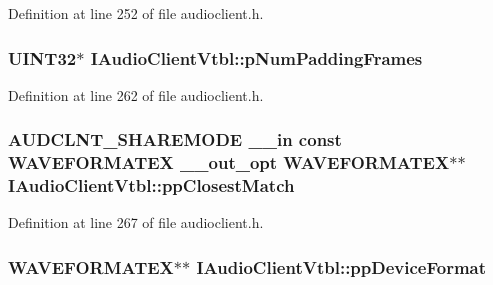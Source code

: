 Definition at line 252 of file audioclient.\+h.

\subsubsection[{\texorpdfstring{p\+Num\+Padding\+Frames}{pNumPaddingFrames}}]{ U\+I\+N\+T32$\ast$ I\+Audio\+Client\+Vtbl\+::p\+Num\+Padding\+Frames}\hypertarget{struct_i_audio_client_vtbl_a917f56ed290e4ee86ad5dd4ec68967b7}{}\label{struct_i_audio_client_vtbl_a917f56ed290e4ee86ad5dd4ec68967b7}


Definition at line 262 of file audioclient.\+h.

\subsubsection[{\texorpdfstring{pp\+Closest\+Match}{ppClosestMatch}}]{ {\bf A\+U\+D\+C\+L\+N\+T\+\_\+\+S\+H\+A\+R\+E\+M\+O\+DE} {\bf \+\_\+\+\_\+in} {\bf const} W\+A\+V\+E\+F\+O\+R\+M\+A\+T\+EX {\bf \+\_\+\+\_\+out\+\_\+opt} W\+A\+V\+E\+F\+O\+R\+M\+A\+T\+EX$\ast$$\ast$ I\+Audio\+Client\+Vtbl\+::pp\+Closest\+Match}\hypertarget{struct_i_audio_client_vtbl_a690b0f60f22b91482b2cec7c25163463}{}\label{struct_i_audio_client_vtbl_a690b0f60f22b91482b2cec7c25163463}


Definition at line 267 of file audioclient.\+h.

\subsubsection[{\texorpdfstring{pp\+Device\+Format}{ppDeviceFormat}}]{ W\+A\+V\+E\+F\+O\+R\+M\+A\+T\+EX$\ast$$\ast$ I\+Audio\+Client\+Vtbl\+::pp\+Device\+Format}\hypertarget{struct_i_audio_client_vtbl_a9714d3e11214f4e2bbcf714a2b7fb797}{}\label{struct_i_audio_client_vtbl_a9714d3e11214f4e2bbcf714a2b7fb797}


